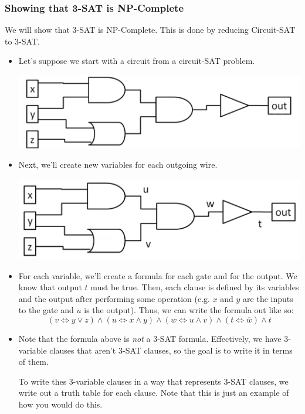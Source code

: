 \documentclass[letterpaper]{article}
\begin{document}
\subsubsection{Showing that 3-SAT is NP-Complete}
We will show that 3-SAT is NP-Complete. This is done by reducing Circuit-SAT to 3-SAT. 
\begin{itemize}
    \item Let's suppose we start with a circuit from a circuit-SAT problem. 
    \begin{center}
        \includegraphics[scale=0.4]{assets/circuit_sat.png}
    \end{center}

    \item Next, we'll create new variables for each outgoing wire.
    \begin{center}
        \includegraphics[scale=0.4]{assets/circuit_sat_2.png}
    \end{center}

    \item For each variable, we'll create a formula for each gate and for the output. We know that output $t$ must be true. Then, each clause is defined by its variables and the output after performing some operation (e.g. $x$ and $y$ are the inputs to the  gate and $u$ is the output). Thus, we can write the formula out like so: 
    \[(v \iff y \lor z) \land (u \iff x \land y) \land (w \iff u \land v) \land (t \iff \overline{w}) \land t\]

    \item Note that the formula above is \emph{not} a 3-SAT formula. Effectively, we have 3-variable clauses that aren't 3-SAT clauses, so the goal is to write it in terms of them. 
    \begin{mdframed}[]
        To write thes 3-variable clauses in a way that represents 3-SAT clauses, we write out a truth table for each clause. Note that this is just an example of how you would do this.
        

\end{mdframed}
\end{itemize}
\end{document}
